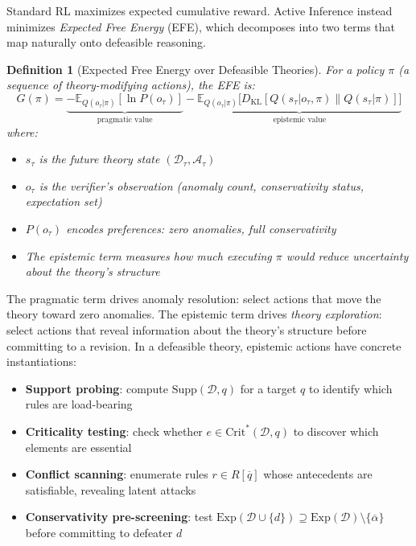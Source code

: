 \documentclass[11pt]{article}
\newtheorem{definition}{Definition}
\newcommand{\D}{\mathcal{D}}
\newcommand{\Exp}{\mathrm{Exp}}
\newcommand{\comp}[1]{\overline{#1}}
\begin{document}
Standard RL maximizes expected cumulative reward. Active Inference instead minimizes \emph{Expected Free Energy} (EFE), which decomposes into two terms that map naturally onto defeasible reasoning.

\begin{definition}[Expected Free Energy over Defeasible Theories]
For a policy $\pi$ (a sequence of theory-modifying actions), the EFE is:
\[
    G(\pi) = \underbrace{-\mathbb{E}_{Q(o_\tau|\pi)}[\ln P(o_\tau)]}_{\text{pragmatic value}} - \underbrace{\mathbb{E}_{Q(o_\tau|\pi)}\bigl[D_{\mathrm{KL}}[Q(s_\tau|o_\tau,\pi) \| Q(s_\tau|\pi)]\bigr]}_{\text{epistemic value}}
\]
where:
\begin{itemize}[nosep]
    \item $s_\tau$ is the future theory state $(\D_\tau, \mathcal{A}_\tau)$
    \item $o_\tau$ is the verifier's observation (anomaly count, conservativity status, expectation set)
    \item $P(o_\tau)$ encodes preferences: zero anomalies, full conservativity
    \item The epistemic term measures how much executing $\pi$ would reduce uncertainty about the theory's structure
\end{itemize}
\end{definition}

The pragmatic term drives anomaly resolution: select actions that move the theory toward zero anomalies. The epistemic term drives \emph{theory exploration}: select actions that reveal information about the theory's structure before committing to a revision. In a defeasible theory, epistemic actions have concrete instantiations:

\begin{itemize}[nosep]
    \item \textbf{Support probing}: compute $\mathrm{Supp}(\D, q)$ for a target $q$ to identify which rules are load-bearing
    \item \textbf{Criticality testing}: check whether $e \in \mathrm{Crit}^*(\D, q)$ to discover which elements are essential
    \item \textbf{Conflict scanning}: enumerate rules $r \in R[\comp{q}]$ whose antecedents are satisfiable, revealing latent attacks
    \item \textbf{Conservativity pre-screening}: test $\Exp(\D \cup \{d\}) \supseteq \Exp(\D) \setminus \{\comp{\alpha}\}$ before committing to defeater $d$
\end{itemize}
\end{document}
